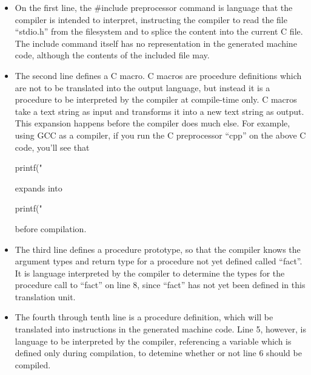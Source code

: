  \begin{itemize}
  \item
     On the first line, the \#include preprocessor command
     is language that the compiler
     is intended to interpret, instructing the compiler to
     read the file ``stdio.h''
     from the filesystem and to splice the content
     into the current C file.  The include command
     itself has no representation in the generated machine code, although the contents
     of the included file may.

  \item
     The second line defines a C macro. C macros are procedure definitions which
      are not to be translated into the output language, but instead it is a procedure
     to be interpreted by the compiler
     at compile-time only.  C macros take a text
     string as input and transforms it into a new text string as output.
     This expansion happens before the compiler does much
     else.  For example, using GCC as a compiler, if you run the C preprocessor
     ``cpp'' on the above C code, you'll see that

     \begin{examplecode}
  printf("%
     \end{examplecode}

     \noindent expands into

     \begin{examplecode}
  printf("%
     \end{examplecode}

     \noindent before compilation.

  \item
     The third line defines a procedure prototype, so that
     the compiler knows the argument types and return type for a procedure not
     yet defined called ``fact''.
     It is language interpreted by the compiler to determine the types for the procedure
     call to ``fact'' on line 8, since ``fact'' has not yet been defined in this
     translation unit.
  \item
     The fourth through tenth line is a procedure definition, which will be
     translated into instructions in the generated machine code.  Line 5, however, is language
     to be interpreted by the compiler, referencing a variable which is defined
     only during compilation, to detemine whether or not line 6 should be
     compiled.
 \end{itemize}

